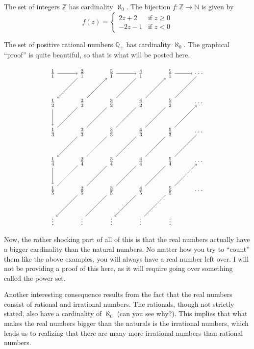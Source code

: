 \begin{example}
    The set of integers $\mathbb{Z}$ has cardinality $\aleph_0$. The bijection $f: \mathbb{Z} \longrightarrow \mathbb{N}$ is given by
    \[
        f(z) = \begin{cases}
            2z + 2 & \text{if }z \geq 0\\
            -2z - 1 & \text{if }z < 0
        \end{cases}
    \]
\end{example}

\begin{example}
    The set of positive rational numbers $\mathbb{Q}_+$ has cardinality $\aleph_0$. The graphical ``proof'' is quite beautiful, so that is what will be posted here. 

    \[
    \begin{tikzpicture}
        \foreach \x in {0,...,4}
            \foreach \y in {0,...,4} 
                \pgfmathsetmacro{\numerator}{int(\x+1)}
                \pgfmathsetmacro{\denominator}{int(\y+1)}
                \node (\x\y) at (1.5*\x,-1.5*\y) {$\frac{\numerator}{\denominator}$};

        \foreach \z in {0,...,4}{
            \node (5\z) at (7.5, -1.5*\z) {$\dots$};
            \node (\z5) at (1.5*\z, -7.5) {$\vdots$};
        }

        \draw[->] (01)--(02);
        \draw[->] (03)--(04);

        \foreach \x in {0, 2, 4}{
            \pgfmathsetmacro{\xi}{int(\x+1)}
            \draw[->] (\x0)--(\xi0);
        }

        \draw[->] (10)--(01);
        \draw[->] (02)--(11)--(20);
        \draw[->] (30)--(21)--(12)--(03);
        \draw[->] (04)--(13)--(22)--(31)--(40);
        \draw[->] (50)--(41)--(32)--(23)--(14)--(05);
        \draw[->] (15)--(24)--(33)--(42)--(51);
        \draw[->] (52)--(43)--(34)--(25);
        \draw[->] (35)--(44)--(53);
    \end{tikzpicture}
    \]
\end{example}

Now, the rather shocking part of all of this is that the real numbers actually have a bigger cardinality than the natural numbers. No matter how you try to ``count'' them like the above examples, you will always have a real number left over. I will not be providing a proof of this here, as it will require going over something called the power set.

Another interesting consequence results from the fact that the real numbers consist of rational and irrational numbers. The rationals, though not strictly stated, also have a cardinality of $\aleph_0$ (can you see why?). This implies that what makes the real numbers bigger than the naturals is the irrational numbers, which leads us to realizing that there are many more irrational numbers than rational numbers.

